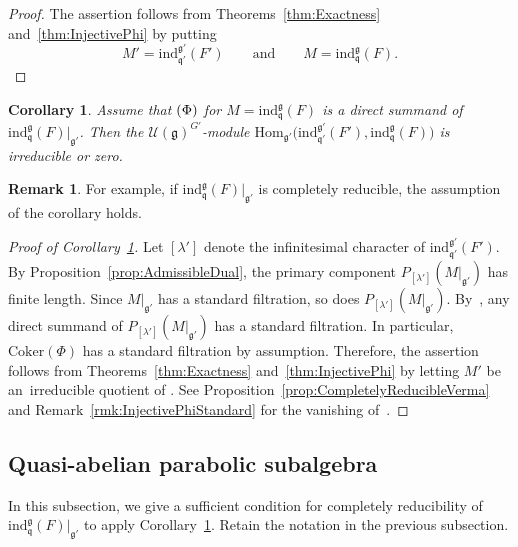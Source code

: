 \documentclass[10pt,a4paper]{amsart}
\numberwithin{equation}{section}
\newtheorem{Corollary}[Theorem]{Corollary}
\theoremstyle{definition}
\newtheorem{Remark}[Theorem]{Remark}
\newcommand{\Coker}{\mathrm{Coker}}
\newcommand{\Hom}{\mathrm{Hom}}
\newcommand{\lieC}[1]{\mathfrak{#1}}
\newcommand{\lie}[1]{\mathfrak{#1}}
\newcommand{\univ}[1]{\mathcal{U}(\lieC{#1})}
\newcommand{\ind}[2]{\mathrm{ind}^{\lieC{#1}}_{\lieC{#2}}}
\newcommand{\zuck}[2]{\Gamma^{#1}_{#2}}
\newcommand{\Dzuck}[3]{R^{#3}\zuck{#1}{#2}}
\let\Im\relax
\DeclareMathOperator{\Im}{\mathrm{Im}}
\newcommand{\fdual}[1]{{#1}^{d}}
\begin{document}
\begin{proof}
	The assertion follows from Theorems~\ref{thm:Exactness} and~\ref{thm:InjectivePhi} by putting
\[
M' = \ind{g'}{q'}(F')\qquad \text{and}\qquad {M = \ind{g}{q}(F)}.
\tag*{\qed}
\]
\renewcommand{\qed}{}
\end{proof}

\begin{Corollary}\label{cor:GeneralizedVermaIrreducible}
	Assume that $\Im(\Phi)$ for $M = \ind{g}{q}(F)$ is a direct summand of $\ind{g}{q}(F)|_{\lie{g'}}$.
	Then the $\univ{g}^{G'}$-module $\Hom_{\lie{g'}}\bigl(\ind{g'}{q'}(F'), \ind{g}{q}(F)\bigr)$ is irreducible or zero.
\end{Corollary}

\begin{Remark}
	For example, if $\ind{g}{q}(F)|_{\lie{g'}}$ is completely reducible, the assumption of the corollary holds.
\end{Remark}

\begin{proof}[Proof of Corollary~\ref{cor:GeneralizedVermaIrreducible}]
	Let $[\lambda']$ denote the infinitesimal character of $\ind{g'}{q'}(F')$.
	By Proposition~\ref{prop:AdmissibleDual}, the primary component $P_{[\lambda']}(M|_{\lie{g'}})$ has finite length.
	Since $M|_{\lie{g'}}$ has a standard filtration, so does $P_{[\lambda']}(M|_{\lie{g'}})$.
	By~\cite[Proposition~3.7 and Theorem~9.8\,(3)]{Hu08_category_o}, any direct summand of $P_{[\lambda']}(M|_{\lie{g'}})$ has a standard filtration.
	In particular, $\Coker(\Phi)$ has a standard filtration by assumption.
	Therefore, the assertion follows from Theorems~\ref{thm:Exactness} and~\ref{thm:InjectivePhi} by letting $M'$ be an~irreducible quotient of \smash{$\ind{g'}{q'}\bigl(\fdual{F'}\bigr)$}.
	See Proposition~\ref{prop:CompletelyReducibleVerma} and Remark~\ref{rmk:InjectivePhiStandard} for the vanishing of~\smash{$\Dzuck{\Delta(G')}{\Delta(L')}{S - 1}(M'\otimes \Coker(\Phi))^{\Delta(G')}$}.
\end{proof}

\subsection{Quasi-abelian parabolic subalgebra}

In this subsection, we give a sufficient condition for completely reducibility of $\ind{g}{q}(F)|_{\lie{g'}}$
to apply Corollary~\ref{cor:GeneralizedVermaIrreducible}.
Retain the notation in the previous subsection.
\end{document}
